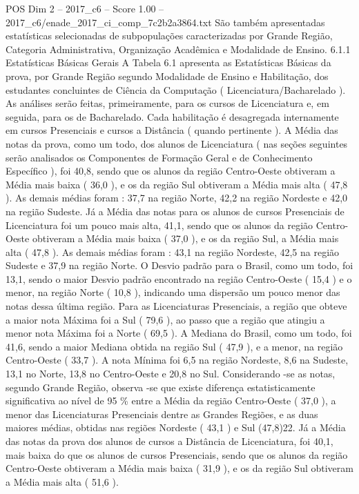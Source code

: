 \begin{textsample}{POS Dim 2 – 2017\_c6 – Score 1.00 – 2017\_c6/enade\_2017\_ci\_comp\_7c2b2a3864.txt}
São também apresentadas estatísticas selecionadas de subpopulações caracterizadas por Grande Região, Categoria Administrativa, Organização Acadêmica e Modalidade de Ensino. 6.1.1 Estatísticas Básicas Gerais A Tabela 6.1 apresenta as Estatísticas Básicas da prova, por Grande Região segundo Modalidade de Ensino e Habilitação, dos estudantes concluintes de Ciência da Computação ( Licenciatura/Bacharelado ).
As análises serão feitas, primeiramente, para os cursos de Licenciatura e, em seguida, para os de Bacharelado.
Cada habilitação é desagregada internamente em cursos Presenciais e cursos a Distância ( quando pertinente ).
A Média das notas da prova, como um todo, dos alunos de Licenciatura ( nas seções seguintes serão analisados os Componentes de Formação Geral e de Conhecimento Específico ), foi 40,8, sendo que os alunos da região Centro-Oeste obtiveram a Média mais baixa ( 36,0 ), e os da região Sul obtiveram a Média mais alta ( 47,8 ).
As demais médias foram : 37,7 na região Norte, 42,2 na região Nordeste e 42,0 na região Sudeste.
Já a Média das notas para os alunos de cursos Presenciais de Licenciatura foi um pouco mais alta, 41,1, sendo que os alunos da região Centro-Oeste obtiveram a Média mais baixa ( 37,0 ), e os da região Sul, a Média mais alta ( 47,8 ).
As demais médias foram : 43,1 na região Nordeste, 42,5 na região Sudeste e 37,9 na região Norte.
O Desvio padrão para o Brasil, como um todo, foi 13,1, sendo o maior Desvio padrão encontrado na região Centro-Oeste ( 15,4 ) e o menor, na região Norte ( 10,8 ), indicando uma dispersão um pouco menor das notas dessa última região.
Para as Licenciaturas Presenciais, a região que obteve a maior nota Máxima foi a Sul ( 79,6 ), ao passo que a região que atingiu a menor nota Máxima foi a Norte ( 69,5 ).
A Mediana do Brasil, como um todo, foi 41,6, sendo a maior Mediana obtida na região Sul ( 47,9 ), e a menor, na região Centro-Oeste ( 33,7 ).
A nota Mínima foi 6,5 na região Nordeste, 8,6 na Sudeste, 13,1 no Norte, 13,8 no Centro-Oeste e 20,8 no Sul.
Considerando -se as notas, segundo Grande Região, observa -se que existe diferença estatisticamente significativa ao nível de 95 \% entre a Média da região Centro-Oeste ( 37,0 ), a menor das Licenciaturas Presenciais dentre as Grandes Regiões, e as duas maiores médias, obtidas nas regiões Nordeste ( 43,1 ) e Sul (47,8)22.
Já a Média das notas da prova dos alunos de cursos a Distância de Licenciatura, foi 40,1, mais baixa do que os alunos de cursos Presenciais, sendo que os alunos da região Centro-Oeste obtiveram a Média mais baixa ( 31,9 ), e os da região Sul obtiveram a Média mais alta ( 51,6 ).

\end{textsample}
